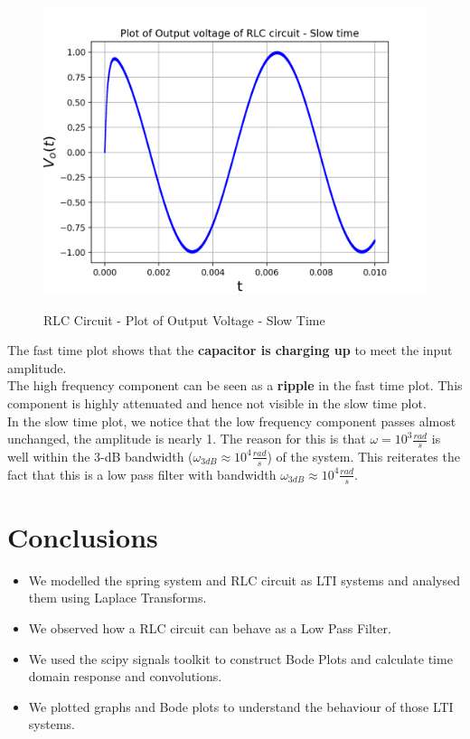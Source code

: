 \documentclass[11pt, a4paper]{article}
\begin{document}
\begin{figure}[H]
   	\centering
   	\includegraphics[scale=0.6]{RLC_slow.png}
   	\label{fig:RLC_slow}
   	\caption{RLC Circuit - Plot of Output Voltage - Slow Time}
\end{figure}
{
The fast time plot shows that the \textbf{capacitor is charging up} to meet the input amplitude. 
\\The high frequency component can be seen as a \textbf{ripple} in the fast time plot.  This component is highly attenuated and hence not visible in the slow time plot.
\\In the slow time plot, we notice that the low frequency component passes almost unchanged, the amplitude is nearly 1.
The reason for this is that $\omega = 10^3\frac{rad}{s}$ is well within the 3-dB bandwidth ($\omega_{3dB} \approx 10^4\frac{rad}{s}$) of the system.
This reiterates the fact that this is a low pass filter with bandwidth $\omega_{3dB} \approx 10^4\frac{rad}{s}$.
}

\section{Conclusions}
\begin{itemize}
\item We  modelled the spring system and RLC circuit as LTI systems and analysed them using Laplace Transforms.
\item We observed how a RLC circuit can behave as a Low Pass Filter.
\item We used the scipy signals toolkit to construct Bode Plots and calculate time domain response and convolutions.
\item We plotted graphs and Bode plots to understand the behaviour of those LTI systems.
\end{itemize}
\end{document}
